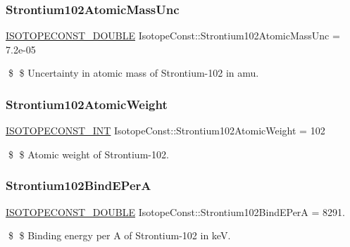 \subsubsection{\texorpdfstring{Strontium102\+Atomic\+Mass\+Unc}{Strontium102AtomicMassUnc}}
{\footnotesize\ttfamily \mbox{\hyperlink{group___isotope_const-_macros_ga8f45a7272ce02c0b4c65c44636ed719a}{I\+S\+O\+T\+O\+P\+E\+C\+O\+N\+S\+T\+\_\+\+D\+O\+U\+B\+LE}} Isotope\+Const\+::\+Strontium102\+Atomic\+Mass\+Unc = 7.\+2e-\/05}

\$ \$ Uncertainty in atomic mass of Strontium-\/102 in amu. \mbox{\label{group___isotope_const-_strontium-_sr102_ga76af029f070da66e6560a95cdd859a0a}} 
\subsubsection{\texorpdfstring{Strontium102\+Atomic\+Weight}{Strontium102AtomicWeight}}
{\footnotesize\ttfamily \mbox{\hyperlink{group___isotope_const-_macros_ga5f18360b3e99483a35c32d789e62621c}{I\+S\+O\+T\+O\+P\+E\+C\+O\+N\+S\+T\+\_\+\+I\+NT}} Isotope\+Const\+::\+Strontium102\+Atomic\+Weight = 102}

\$ \$ Atomic weight of Strontium-\/102. \mbox{\label{group___isotope_const-_strontium-_sr102_ga2c9056fc405c4479c274aed65626bd31}} 
\subsubsection{\texorpdfstring{Strontium102\+Bind\+E\+PerA}{Strontium102BindEPerA}}
{\footnotesize\ttfamily \mbox{\hyperlink{group___isotope_const-_macros_ga8f45a7272ce02c0b4c65c44636ed719a}{I\+S\+O\+T\+O\+P\+E\+C\+O\+N\+S\+T\+\_\+\+D\+O\+U\+B\+LE}} Isotope\+Const\+::\+Strontium102\+Bind\+E\+PerA = 8291.}

\$ \$ Binding energy per A of Strontium-\/102 in keV. \mbox{\label{group___isotope_const-_strontium-_sr102_ga9f76928178fda5e4509e88817b0fec8e}} 
